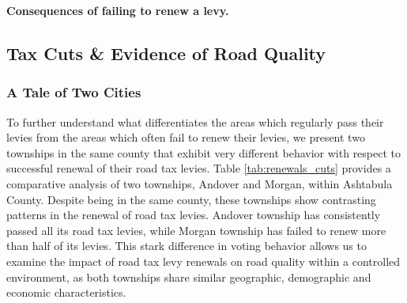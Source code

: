 {\bf Consequences of failing to renew a levy.}


\subsection{Tax Cuts \& Evidence of Road Quality}


\subsubsection{A Tale of Two Cities}

To further understand what differentiates the areas which regularly pass their levies from the areas which often fail to renew their levies, we present two townships in the same county that exhibit very different behavior with respect to successful renewal of their road tax levies. Table \ref{tab:renewals_cuts} provides a comparative analysis of two townships, Andover and Morgan, within Ashtabula County. Despite being in the same county, these townships show contrasting patterns in the renewal of road tax levies. Andover township has consistently passed all its road tax levies, while Morgan township has failed to renew more than half of its levies. This stark difference in voting behavior allows us to examine the impact of road tax levy renewals on road quality within a controlled environment, as both townships share similar geographic,  demographic and economic characteristics.

